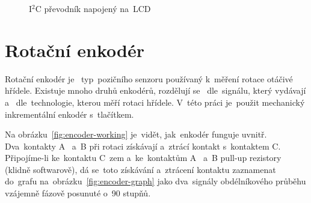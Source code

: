 \begin{figure}[htb]
\begin{minipage}{0.45\textwidth}
    \caption{\label{fig:LCD_back} I$^{2}$C převodník napojený na~LCD~\cite{laskakit-LCD}}
  \end{minipage}
\end{figure}



\section{Rotační enkodér~\cite{how-encoders-work}\cite{rotary-encoder-cvut}}
Rotační enkodér je ~typ~pozičního senzoru používaný  k~měření rotace otáčivé hřídele. Existuje mnoho druhů enkodérů, rozdělují se ~dle~signálu, který vydávají a ~dle~technologie, kterou měří rotaci hřídele.  V~této práci je~použit mechanický inkrementální enkodér  s~tlačítkem.

Na obrázku~\ref{fig:encoder-working} je~vidět,  jak~enkodér funguje uvnitř.  Dva~kontakty A ~a~B při rotaci získávají a~ztrácí kontakt  s~kontaktem C. Připojíme-li ke~kontaktu  C~zem a~ke~kontaktům A ~a~B pull-up rezistory (klidně softwarově), dá se~toto získávání a~ztrácení kontaktu zaznamenat do~grafu na~obrázku~\ref{fig:encoder-graph} jako  dva~signály obdélníkového průběhu vzájemně fázově posunuté  o~90 stupňů.

